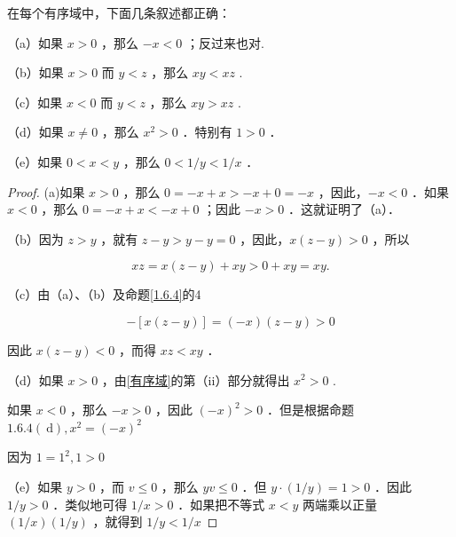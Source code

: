\begin{proposition}
	在每个有序域中，下面几条叙述都正确：
	
	（a）如果 $x>0$ ，那么 $-x<0$ ；反过来也对.
	
	（b）如果 $x>0$ 而 $y<z$ ，那么 $x y<x z$ .
	
	（c）如果 $x<0$ 而 $y<z$ ，那么 $x y>x z$ .
	
	（d）如果 $x \neq 0$ ，那么 $x^2>0$ ．特别有 $1>0$ ．
	
	（e）如果 $0<x<y$ ，那么 $0<1 / y<1 / x$ ．
\end{proposition}
\begin{proof}
	(a)如果 $x>0$ ，那么 $0=-x+x>-x+0=-x$ ，因此，$-x<0$ ．如果 $x<0$ ，那么 $0=-x+x<-x+0$ ；因此 $-x>0$ ．这就证明了（a）．
	
	（b）因为 $z>y$ ，就有 $z-y>y-y=0$ ，因此，$x(z-y)>0$ ，所以
	
	$$
	x z=x(z-y)+x y>0+x y=x y .
	$$
	
	（c）由（a）、（b）及命题\ref{1.6.4}的4
	
	$$
	-[x(z-y)]=(-x)(z-y)>0
	$$
	
	
	因此 $x(z-y)<0$ ，而得 $x z<x y$ ．
	
	（d）如果 $x>0$ ，由\ref{有序域}的第（ii）部分就得出 $x^2>0$ .
	
	如果 $x<0$ ，那么 $-x>0$ ，因此 $(-x)^2>0$ ．但是根据命题 $1.6.4(\mathrm{~d}), x^2=(-x)^2$ 
	
	因为 $1= 1^2, 1>0$ 
	
	（e）如果 $y>0$ ，而 $v \leqslant 0$ ，那么 $y v \leqslant 0$ ．但 $y \cdot(1 / y)=1>0$ ．因此 $1 / y>0$ ．类似地可得 $1 / x>0$ ．如果把不等式 $x<y$ 两端乘以正量 $(1 / x)(1 / y)$ ，就得到 $1 / y<1 / x$ 
\end{proof}





